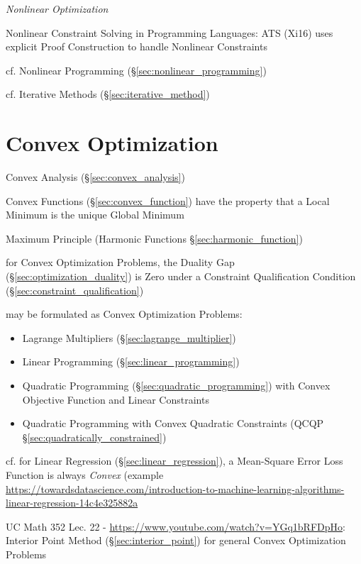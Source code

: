 
\emph{Nonlinear Optimization}

Nonlinear Constraint Solving in Programming Languages: ATS (Xi16) uses
explicit Proof Construction to handle Nonlinear Constraints

\fist cf. Nonlinear Programming (\S\ref{sec:nonlinear_programming})

\fist cf. Iterative Methods (\S\ref{sec:iterative_method})



\section{Convex Optimization}\label{sec:convex_optimization}

Convex Analysis (\S\ref{sec:convex_analysis})

Convex Functions (\S\ref{sec:convex_function}) have the property that a Local
Minimum is the unique Global Minimum

Maximum Principle (Harmonic Functions \S\ref{sec:harmonic_function})

for Convex Optimization Problems, the Duality Gap
(\S\ref{sec:optimization_duality}) is Zero under a Constraint Qualification
Condition (\S\ref{sec:constraint_qualification})

may be formulated as Convex Optimization Problems:
\begin{itemize}
  \item Lagrange Multipliers (\S\ref{sec:lagrange_multiplier})
  \item Linear Programming (\S\ref{sec:linear_programming})
  \item Quadratic Programming (\S\ref{sec:quadratic_programming}) with Convex
    Objective Function and Linear Constraints
  \item Quadratic Programming with Convex Quadratic Constraints
    (QCQP \S\ref{sec:quadratically_constrained})
\end{itemize}

cf. for Linear Regression (\S\ref{sec:linear_regression}), a Mean-Square Error
Loss Function is always \emph{Convex} (example
\url{https://towardsdatascience.com/introduction-to-machine-learning-algorithms-linear-regression-14c4e325882a}

UC Math 352 Lec. 22 - \url{https://www.youtube.com/watch?v=YGq1bRFDpHo}:
Interior Point Method (\S\ref{sec:interior_point}) for general Convex
Optimization Problems

